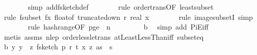 \begin{isabellebody}
\ \ \ \ \ \ \isamarkupfalse%
\ {\isacharparenleft}{\kern0pt}simp\ add{\isacharcolon}{\kern0pt}f{}{\isacharunderscore}{\kern0pt}sketch{\isacharunderscore}{\kern0pt}def{\isacharparenright}{\kern0pt}\isanewline
\ \ \ \ \ \ \isamarkupfalse%
\ {\isacharparenleft}{\kern0pt}rule\ order{\isacharunderscore}{\kern0pt}trans{\isacharbrackleft}{\kern0pt}OF\ least{\isacharunderscore}{\kern0pt}subset{\isacharbrackright}{\kern0pt}{\isacharparenright}{\kern0pt}\isanewline
\ \ \ \ \ \ \isamarkupfalse%
\ {\isacharparenleft}{\kern0pt}rule\ f{\isacharunderscore}{\kern0pt}subset{\isacharbrackleft}{\kern0pt}\ f{\isacharequal}{\kern0pt}{\isachardoublequoteopen}{\isasymlambda}x{\isachardot}{\kern0pt}\ float{\isacharunderscore}{\kern0pt}of\ {\isacharparenleft}{\kern0pt}truncate{\isacharunderscore}{\kern0pt}down\ r\ {\isacharparenleft}{\kern0pt}real\ x{\isacharparenright}{\kern0pt}{\isacharparenright}{\kern0pt}{\isachardoublequoteclose}{\isacharbrackright}{\kern0pt}{\isacharparenright}{\kern0pt}\isanewline
\ \ \ \ \ \ \isamarkupfalse%
\ {\isacharparenleft}{\kern0pt}rule\ image{\isacharunderscore}{\kern0pt}subsetI{\isacharcomma}{\kern0pt}\ simp{\isacharparenright}{\kern0pt}\isanewline
\ \ \ \ \ \ \isamarkupfalse%
\ {\isacharparenleft}{\kern0pt}rule\ hash{\isacharunderscore}{\kern0pt}range{\isacharbrackleft}{\kern0pt}OF\ p{\isacharunderscore}{\kern0pt}ge{\isacharunderscore}{\kern0pt}{}{\isacharcomma}{\kern0pt}\ \ n{\isacharequal}{\kern0pt}{\isachardoublequoteopen}{}{\isachardoublequoteclose}{\isacharbrackright}{\kern0pt}{\isacharparenright}{\kern0pt}\isanewline
\ \ \ \ \ \ \ \isamarkupfalse%
\ b{\isacharunderscore}{\kern0pt}{}\ \isamarkupfalse%
\ {\isacharparenleft}{\kern0pt}simp\ add{\isacharcolon}{\kern0pt}\ PiE{\isacharunderscore}{\kern0pt}iff{\isacharparenright}{\kern0pt}\isanewline
\ \ \ \ \ \ \isamarkupfalse%
\ {\isacharparenleft}{\kern0pt}metis\ assms{\isacharparenleft}{\kern0pt}{}{\isacharparenright}{\kern0pt}\ n{\isacharunderscore}{\kern0pt}le{\isacharunderscore}{\kern0pt}p\ order{\isacharunderscore}{\kern0pt}less{\isacharunderscore}{\kern0pt}le{\isacharunderscore}{\kern0pt}trans\ atLeastLessThan{\isacharunderscore}{\kern0pt}iff\ subset{\isacharunderscore}{\kern0pt}eq{\isacharparenright}{\kern0pt}\isanewline
\ \ \ \ \isamarkupfalse%
\ b{\isacharunderscore}{\kern0pt}{}{\isacharcolon}{\kern0pt}\ {\isachardoublequoteopen}{\isasymAnd}y{\isachardot}{\kern0pt}\ y\ {\isasymin}\ {\isacharparenleft}{\kern0pt}{\isasymlambda}z{\isachardot}{\kern0pt}\ f{}{\isacharunderscore}{\kern0pt}sketch\ p\ r\ t\ {\isacharparenleft}{\kern0pt}x\ z{\isacharparenright}{\kern0pt}\ as{\isacharparenright}{\kern0pt}\ {\isacharbackquote}{\kern0pt}\ {\isacharbraceleft}{\kern0pt}{}{\isachardot}{\kern0pt}{\isachardot}{\kern0pt}{\isacharless}{\kern0pt}s{\isacharbraceright}{\kern0pt}\ {\isasymLongrightarrow}\ \isanewline

\end{isabellebody}
